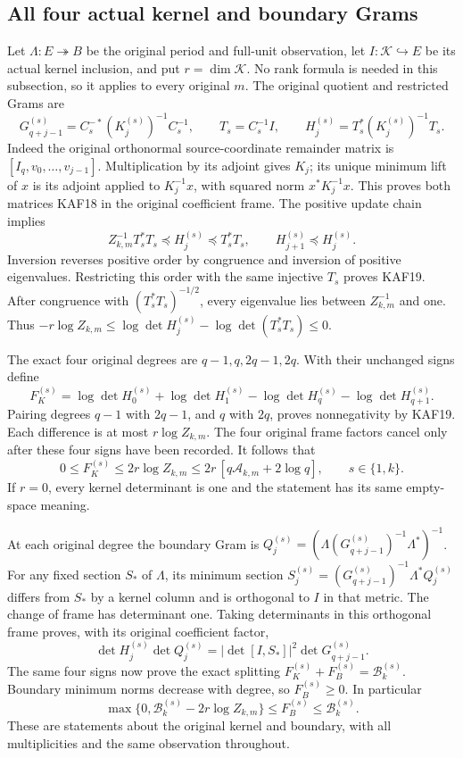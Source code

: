 \documentclass[11pt,a4paper]{article}
\begin{document}
\subsection{All four actual kernel and boundary Grams}
Let $\Lambda:E\twoheadrightarrow B$ be the original period and full-unit
observation, let $I:\mathcal K\hookrightarrow E$ be its actual kernel
inclusion, and put $r=\dim\mathcal K$. No rank formula is needed in
this subsection, so it applies to every original $m$. The original
quotient and restricted Grams are
\[
 G_{q+j-1}^{(s)}=C_s^{-*}(K_j^{(s)})^{-1}C_s^{-1},\qquad
 T_s=C_s^{-1}I,\qquad H_j^{(s)}=T_s^*(K_j^{(s)})^{-1}T_s.
 \tag{KAF18}
\]
Indeed the original orthonormal source-coordinate remainder matrix is
$[I_q,v_0,\ldots,v_{j-1}]$. Multiplication by its adjoint gives $K_j$;
its unique minimum lift of $x$ is its adjoint applied to $K_j^{-1}x$,
with squared norm $x^*K_j^{-1}x$. This proves both matrices KAF18
in the original coefficient frame. The positive update chain implies
\[
 Z_{k,m}^{-1}T_s^*T_s\preceq H_j^{(s)}\preceq T_s^*T_s,
 \qquad H_{j+1}^{(s)}\preceq H_j^{(s)}.\tag{KAF19}
\]
Inversion reverses positive order by congruence and inversion of
positive eigenvalues. Restricting this order with the same injective
$T_s$ proves KAF19. After congruence with $(T_s^*T_s)^{-1/2}$,
every eigenvalue lies between $Z_{k,m}^{-1}$ and one. Thus
$-r\log Z_{k,m}\le\log\det H_j^{(s)}-
\log\det(T_s^*T_s)\le0$.

The exact four original degrees are $q-1,q,2q-1,2q$. With their
unchanged signs define
\[
 F_K^{(s)}=\log\det H_0^{(s)}+\log\det H_1^{(s)}
              -\log\det H_q^{(s)}-\log\det H_{q+1}^{(s)}.
\]
Pairing degrees $q-1$ with $2q-1$, and $q$ with $2q$, proves
nonnegativity by KAF19. Each difference is at most $r\log Z_{k,m}$.
The four original frame factors cancel only after these four signs
have been recorded. It follows that
\[
 \boxed{0\le F_K^{(s)}\le2r\log Z_{k,m}
       \le2r\,[q\mathcal A_{k,m}+2\log q],\qquad s\in\{1,k\}.}
 \tag{KAF20}
\]
If $r=0$, every kernel determinant is one and the statement has its
same empty-space meaning.

At each original degree the boundary Gram is
$Q_j^{(s)}=(\Lambda(G_{q+j-1}^{(s)})^{-1}\Lambda^*)^{-1}$.
For any fixed section $S_*$ of $\Lambda$, its minimum section
$S_j^{(s)}=(G_{q+j-1}^{(s)})^{-1}\Lambda^*Q_j^{(s)}$ differs from
$S_*$ by a kernel column and is orthogonal to $I$ in that metric.
The change of frame has determinant one. Taking determinants in this
orthogonal frame proves, with its original coefficient factor,
\[
 \det H_j^{(s)}\det Q_j^{(s)}
       =|\det[I,S_*]|^2\det G_{q+j-1}^{(s)}.
\]
The same four signs now prove the exact splitting
$F_K^{(s)}+F_B^{(s)}=\mathcal B_k^{(s)}$. Boundary minimum norms
decrease with degree, so $F_B^{(s)}\ge0$. In particular
\[
 \boxed{\max\{0,\mathcal B_k^{(s)}-2r\log Z_{k,m}\}
       \le F_B^{(s)}\le\mathcal B_k^{(s)}.}\tag{KAF21}
\]
These are statements about the original kernel and boundary, with
all multiplicities and the same observation throughout.
\end{document}
